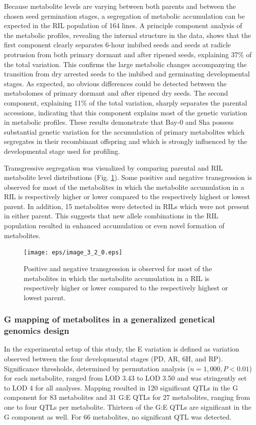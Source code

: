 Because metabolite levels are varying between both parents and between the chosen seed germination stages, a segregation of 
metabolic accumulation can be expected in the RIL population of 164 lines. A principle component analysis of the metabolic 
profiles, revealing the internal structure in the data, shows that the first component clearly separates 6-hour imbibed seeds 
and seeds at radicle protrusion from both primary dormant and after ripened seeds, explaining 37\% of the total variation. 
This confirms the large metabolic changes accompanying the transition from dry arrested seeds to the 
imbibed and germinating developmental stages. As expected, no obvious differences could be detected between the metabolomes 
of primary dormant and after ripened dry seeds. The second component, explaining 11\% of the total variation, sharply separates 
the parental accessions, indicating that this component explains most of the genetic variation in metabolic profiles. These 
results demonstrate that Bay-0 and Sha possess substantial genetic variation for the accumulation of primary metabolites which 
segregates in their recombinant offspring and which is strongly influenced by the developmental stage used for profiling.

Transgressive segregation was visualized by comparing parental and RIL metabolite level distributions (Fig. \ref{fig:transgression}). 
Some positive and negative transgression is observed for most of the metabolites in which the metabolite accumulation in a 
RIL is respectively higher or lower compared to the respectively highest or lowest parent. In addition, 15 metabolites were 
detected in RILs which were not present in either parent. This suggests that new allele combinations in the RIL population 
resulted in enhanced accumulation or even novel formation of metabolites.


\begin{figure}[!ht]
  \centering
  \texttt{[image: eps/image\_3\_2\_0.eps]}
  \caption[Transgression]{Positive and negative transgression is observed for most of the metabolites in which the metabolite 
  		  accumulation in a RIL is respectively higher or lower compared to the respectively highest or lowest parent.}
    \label{fig:transgression}
\end{figure}


\subsubsection{G mapping of metabolites in a generalized genetical genomics design}
In the experimental setup of this study, the E variation is defined as variation observed between the four
developmental stages (PD, AR, 6H, and RP). Significance thresholds, determined by permutation analysis
($n = 1,000, P < 0.01$) for each metabolite, ranged from LOD 3.43 to LOD 3.50 and was stringently set to 
LOD 4 for all analyses. Mapping resulted in 120 significant QTLs in the G component for 83 metabolites and 
31 G:E QTLs for 27 metabolites, ranging from one to four QTLs per metabolite. Thirteen of the G:E QTLs are
significant in the G component as well. For 66 metabolites, no significant QTL was detected.

